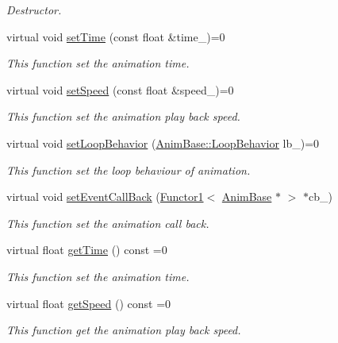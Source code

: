 \begin{DoxyCompactItemize}
\begin{DoxyCompactList}\small\item\em Destructor. \end{DoxyCompactList}\item 
virtual void \hyperlink{class_magnum_1_1_anim_base_aa096e69ae333227ceb4efe80a6985869}{set\+Time} (const float \&time\+\_\+)=0
\begin{DoxyCompactList}\small\item\em This function set the animation time. \end{DoxyCompactList}\item 
virtual void \hyperlink{class_magnum_1_1_anim_base_a2719e2efd31cc11e9d1f33bf26ffb827}{set\+Speed} (const float \&speed\+\_\+)=0
\begin{DoxyCompactList}\small\item\em This function set the animation play back speed. \end{DoxyCompactList}\item 
virtual void \hyperlink{class_magnum_1_1_anim_base_a18c12544926a889ca4903eaeeaba28b6}{set\+Loop\+Behavior} (\hyperlink{class_magnum_1_1_anim_base_ad6b3de9518d395df5ca9865f268ec581}{Anim\+Base\+::\+Loop\+Behavior} lb\+\_\+)=0
\begin{DoxyCompactList}\small\item\em This function set the loop behaviour of animation. \end{DoxyCompactList}\item 
virtual void \hyperlink{class_magnum_1_1_anim_base_a4e12925fe152f0a7c92a57ea0e7c5247}{set\+Event\+Call\+Back} (\hyperlink{class_magnum_1_1_functor1}{Functor1}$<$ \hyperlink{class_magnum_1_1_anim_base}{Anim\+Base} $\ast$ $>$ $\ast$cb\+\_\+)
\begin{DoxyCompactList}\small\item\em This function set the animation call back. \end{DoxyCompactList}\item 
virtual float \hyperlink{class_magnum_1_1_anim_base_aa442e6568018f83b5287c30291d9b109}{get\+Time} () const  =0
\begin{DoxyCompactList}\small\item\em This function set the animation time. \end{DoxyCompactList}\item 
virtual float \hyperlink{class_magnum_1_1_anim_base_a8c3facbd86f9d22572bd3982c186ac8b}{get\+Speed} () const  =0
\begin{DoxyCompactList}\small\item\em This function get the animation play back speed. \end{DoxyCompactList}\item 

\end{DoxyCompactItemize}
